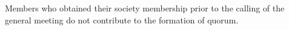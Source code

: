 \begin{clause}
    Members who obtained their society membership prior to the calling of the general meeting do not contribute to the formation of quorum.
\end{clause}